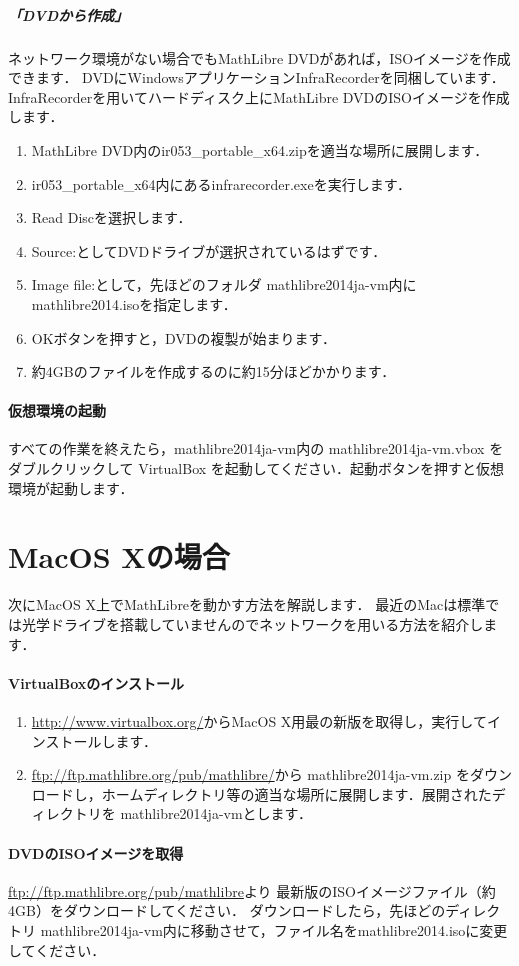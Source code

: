 \documentclass[a4j]{ltjsarticle}
\newcommand{\ir}{ir053\_portable\_x64}
\newcommand{\vm}{mathlibre2014ja-vm}
\begin{document}
\subparagraph{「DVDから作成」}
ネットワーク環境がない場合でもMathLibre DVDがあれば，ISOイメージを作成できます．
DVDにWindowsアプリケーションInfraRecorderを同梱しています．
InfraRecorderを用いてハードディスク上にMathLibre DVDのISOイメージを作成
します．
\begin{enumerate}
 \item MathLibre DVD内の\ir.zipを適当な場所に展開します．
 \item \ir 内にあるinfrarecorder.exeを実行します．
 \item Read Discを選択します．
 \item Source:としてDVDドライブが選択されているはずです．
 \item Image file:として，先ほどのフォルダ \vm 内にmathlibre2014.isoを指定します．
 \item OKボタンを押すと，DVDの複製が始まります．
 \item 約4GBのファイルを作成するのに約15分ほどかかります．
\end{enumerate}

\paragraph{仮想環境の起動}
すべての作業を終えたら，\vm 内の \vm.vbox をダブルクリックして
VirtualBox を起動してください．起動ボタンを押すと仮想環境が起動します．

\section{MacOS Xの場合}
次にMacOS X上でMathLibreを動かす方法を解説します．
最近のMacは標準では光学ドライブを搭載していませんのでネットワークを用いる方法を紹介します．
\paragraph{VirtualBoxのインストール}
\begin{enumerate}
 \item \url{http://www.virtualbox.org/}からMacOS X用最の新版を取得し，実行してインストールします．
 \item \url{ftp://ftp.mathlibre.org/pub/mathlibre/}から \vm.zip をダウンロードし，ホームディレクトリ等の適当な場所に展開します．展開されたディレクトリを \vm とします．
\end{enumerate}

\paragraph{DVDのISOイメージを取得}
\url{ftp://ftp.mathlibre.org/pub/mathlibre}より
最新版のISOイメージファイル（約4GB）をダウンロードしてください．
ダウンロードしたら，先ほどのディレクトリ \vm 内に移動させて，ファイル名をmathlibre2014.isoに変更してください．
\end{document}
